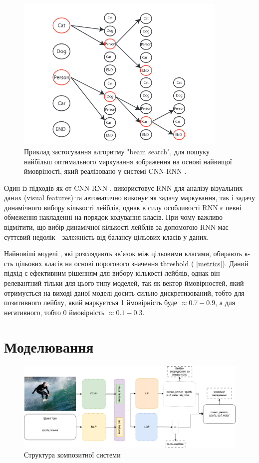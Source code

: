 \documentclass{udstu}
\begin{document}
\begin{figure}[!ht]
	\centering
	\includegraphics[width=0.9\textwidth]{PNG/cnn-rnn-lqp}
	\caption{
	Приклад застосування алгоритму "beam search", для
	пошуку найбільш оптимального маркування зображення
	на основі найвищої ймовріності, який
	реалізовано у системі CNN-RNN \cite{cnn-rnn}.
	}
	\label{figure:cnn-rnn-lqp}
\end{figure}

Один із підходів як-от CNN-RNN \cite{cnn-rnn},
використовує RNN для аналізу візуальних даних (visual features) та автоматично виконує як задачу маркування,
так і задачу динамічного вибору кількості лейблів, однак в силу особливості RNN є певні обмеження
накладенні на порядок кодування класів. При чому важливо відмітити, що вибір динамічної кількості лейблів
за допомогою RNN має суттєвий недолік - залежність від балансу цільових класів у даних.

Найновіші моделі \cite{q2l, cpsd, cma}, які розглядають зв'язок між цільовими класами, обирають
к-сть цільових класів на основі порогового значення threshold (\chaptername{ \ref{metrics}}).
Даний підхід є ефективним рішенням для вибору кількості лейблів, однак він релевантний
тільки для цього типу моделей, так як вектор ймовірностей, який отримується на виході
даної моделі досить сильно дискретизований, тобто для позитивного лейблу,
який маркуєтсья 1 ймовірність буде $\approx 0.7-0.9$,
а для негативного, тобто 0 ймовірність $\approx 0.1-0.3$.


\chapter{Моделювання}

\begin{figure}[!ht]
	\centering
	\includegraphics[width=1.0\textwidth]{PNG/composite}
	\caption{Структура композитної системи}
	\label{figure:composite}
\end{figure}
\end{document}
